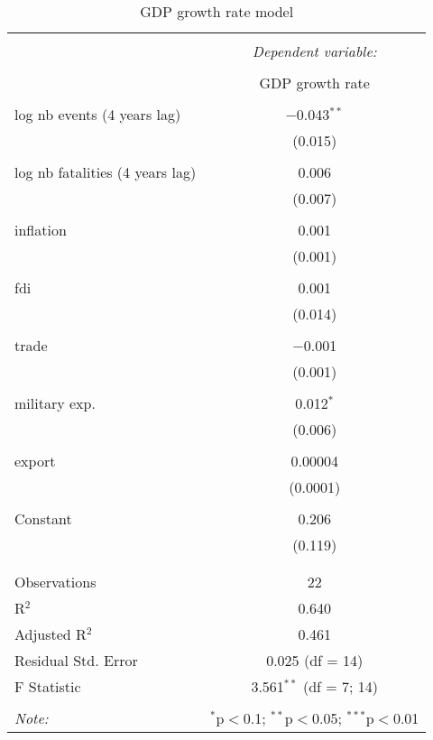 
\begin{table}[!htbp] \centering 
  \caption{GDP growth rate model} 
  \label{} 
\begin{tabular}{@{\extracolsep{5pt}}lc} 
\\[-1.8ex]\hline 
\hline \\[-1.8ex] 
 & \multicolumn{1}{c}{\textit{Dependent variable:}} \\ 
\cline{2-2} 
\\[-1.8ex] & GDP growth rate \\ 
\hline \\[-1.8ex] 
 log nb events (4 years lag) & $-$0.043$^{**}$ \\ 
  & (0.015) \\ 
  & \\ 
 log nb fatalities (4 years lag) & 0.006 \\ 
  & (0.007) \\ 
  & \\ 
 inflation & 0.001 \\ 
  & (0.001) \\ 
  & \\ 
 fdi & 0.001 \\ 
  & (0.014) \\ 
  & \\ 
 trade & $-$0.001 \\ 
  & (0.001) \\ 
  & \\ 
 military exp. & 0.012$^{*}$ \\ 
  & (0.006) \\ 
  & \\ 
 export & 0.00004 \\ 
  & (0.0001) \\ 
  & \\ 
 Constant & 0.206 \\ 
  & (0.119) \\ 
  & \\ 
\hline \\[-1.8ex] 
Observations & 22 \\ 
R$^{2}$ & 0.640 \\ 
Adjusted R$^{2}$ & 0.461 \\ 
Residual Std. Error & 0.025 (df = 14) \\ 
F Statistic & 3.561$^{**}$ (df = 7; 14) \\ 
\hline 
\hline \\[-1.8ex] 
\textit{Note:}  & \multicolumn{1}{r}{$^{*}$p$<$0.1; $^{**}$p$<$0.05; $^{***}$p$<$0.01} \\ 
\end{tabular} 
\end{table} 
